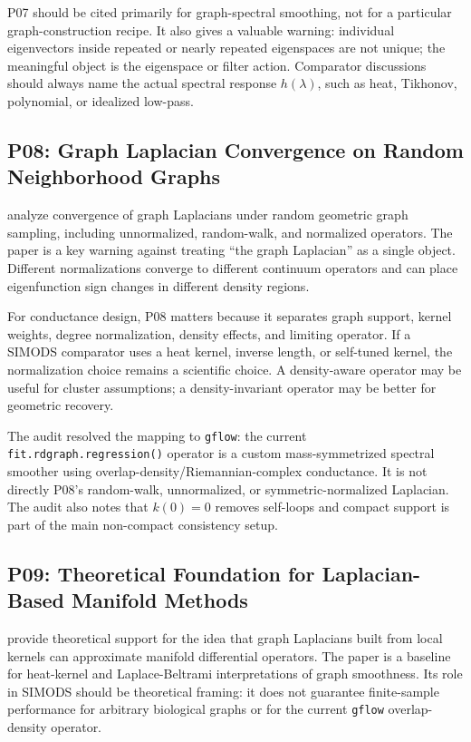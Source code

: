\documentclass[11pt]{article}
\newcommand{\code}[1]{\texttt{#1}}
\begin{document}
P07 should be cited primarily for graph-spectral smoothing, not for a
particular graph-construction recipe.  It also gives a valuable warning:
individual eigenvectors inside repeated or nearly repeated eigenspaces are not
unique; the meaningful object is the eigenspace or filter action.  Comparator
discussions should always name the actual spectral response \(h(\lambda)\),
such as heat, Tikhonov, polynomial, or idealized low-pass.

\subsection{P08: Graph Laplacian Convergence on Random Neighborhood Graphs}

\citet{hein2007graph} analyze convergence of graph Laplacians under random
geometric graph sampling, including unnormalized, random-walk, and normalized
operators.  The paper is a key warning against treating ``the graph
Laplacian'' as a single object.  Different normalizations converge to
different continuum operators and can place eigenfunction sign changes in
different density regions.

For conductance design, P08 matters because it separates graph support,
kernel weights, degree normalization, density effects, and limiting operator.
If a SIMODS comparator uses a heat kernel, inverse length, or self-tuned
kernel, the normalization choice remains a scientific choice.  A density-aware
operator may be useful for cluster assumptions; a density-invariant operator
may be better for geometric recovery.

The audit resolved the mapping to \code{gflow}: the current
\code{fit.rdgraph.regression()} operator is a custom mass-symmetrized spectral
smoother using overlap-density/Riemannian-complex conductance.  It is not
directly P08's random-walk, unnormalized, or symmetric-normalized Laplacian.
The audit also notes that \(k(0)=0\) removes self-loops and compact support is
part of the main non-compact consistency setup.

\subsection{P09: Theoretical Foundation for Laplacian-Based Manifold Methods}

\citet{belkin2008towards} provide theoretical support for the idea that graph
Laplacians built from local kernels can approximate manifold differential
operators.  The paper is a baseline for heat-kernel and Laplace-Beltrami
interpretations of graph smoothness.  Its role in SIMODS should be theoretical
framing: it does not guarantee finite-sample performance for arbitrary
biological graphs or for the current \code{gflow} overlap-density operator.
\end{document}
